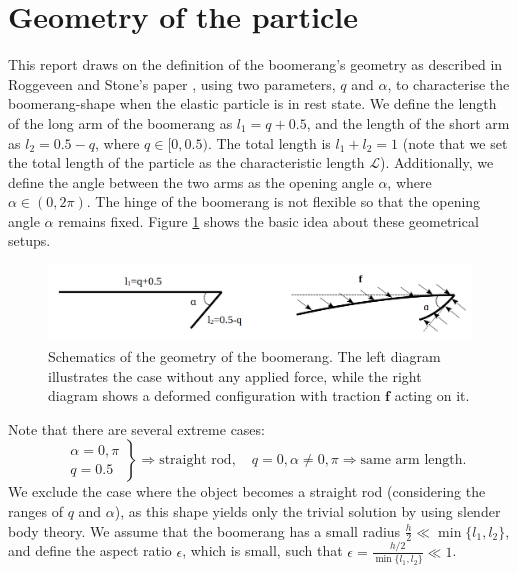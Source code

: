 \documentclass[a4paper,12pt]{report}
\begin{document}
\section{Geometry of the particle}
This report draws on the definition of the boomerang's geometry as described in Roggeveen and Stone's paper \cite{roggeveen2022motion}, using two parameters, $q$ and $\alpha$, to characterise the boomerang-shape when the elastic particle is in rest state. We define the length of the long arm of the boomerang as $l_1=q+0.5$, and the length of the short arm as $l_2=0.5-q$, where $q \in [0,0.5)$. The total length is $l_1+l_2=1$ (note that we set the total length of the particle as the characteristic length $\mathcal{L}$). Additionally, we define the angle between the two arms as the opening angle $\alpha$, where $\alpha \in (0,2\pi)$. The hinge of the boomerang is not flexible so that the opening angle $\alpha$ remains fixed. Figure \ref{fig:1} shows the basic idea about these geometrical setups. 
\begin{figure}[htb]
	\begin{center}
		\includegraphics[width=1\textwidth]{plot/geometry.png}
		\caption{Schematics of the geometry of the boomerang. The left diagram illustrates the case without any applied force, while the right diagram shows a deformed configuration with traction $\mathbf{f}$ acting on it.}
		\label{fig:1}
	\end{center}
\end{figure}
Note that there are several extreme cases:
\begin{equation}
	\label{eqn:1}
	\left.
	\begin{aligned}
		&\alpha=0,\pi \\
		&	q=0.5
	\end{aligned}
	\right\}\Longrightarrow \text{straight rod},\quad 
	q=0, \alpha \neq 0, \pi \Longrightarrow \text{same arm length}.
\end{equation}
We exclude the case where the object becomes a straight rod (considering the ranges of $q$ and $\alpha$), as this shape yields only the trivial solution by using slender body theory. We assume that the boomerang has a small radius $\frac{h}{2}\ll \min\{l_1, l_2\}$, and define the aspect ratio $\epsilon$, which is small, such that $\epsilon=\frac{h/2}{\min\{l_1, l_2\}}\ll1$. 
\end{document}
